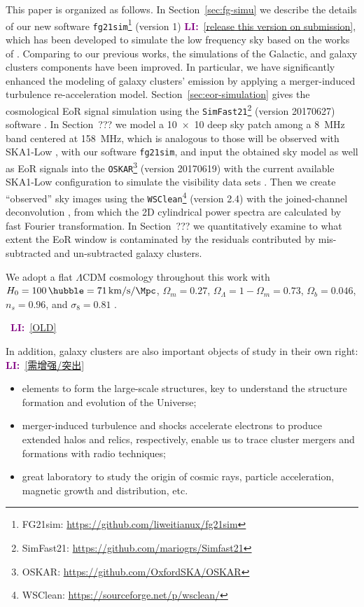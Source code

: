 \documentclass[modern]{aastex61}
\newcommand{\lcdm}{$\Lambda$CDM}
\newcommand{\LI}[1]{\textcolor{purple}{\textbf{LI:}}~\uline{#1}}
\begin{document}
This paper is organized as follows.
In Section~\ref{sec:fg-simu} we describe the details of our new software
\texttt{fg21sim}\footnote{FG21sim: \url{https://github.com/liweitianux/fg21sim}}
(version 1) \LI{[release this version on submission]},
which has been developed to simulate the low frequency sky based on the
works of \citet{wang2010,wang2013}.
Comparing to our previous works, the simulations of the Galactic,
and galaxy clusters components have been improved.
In particular, we have significantly enhanced the modeling of galaxy clusters'
emission by applying a merger-induced turbulence re-acceleration model.
Section~\ref{sec:eor-simulation} gives the cosmological EoR signal simulation
using the \texttt{SimFast21}\footnote{SimFast21:
  \url{https://github.com/mariogrs/Simfast21}} (version 20170627)
software \citep{santos2010,hassan2016}.
In Section~??? we model a \SI[product-units=power]{10 x 10}{\deg} deep sky
patch among a \SI{8}{\MHz} band centered at \SI{158}{\MHz}, which is
analogous to those will be observed with SKA1-Low
\citep[see][for updated SKA observing strategies]{koopmans2015rev},
with our software \texttt{fg21sim},
and input the obtained sky model as well as EoR signals into the
\texttt{OSKAR}\footnote{OSKAR: \url{https://github.com/OxfordSKA/OSKAR}}
(version 20170619) with the current available SKA1-Low configuration to
simulate the visibility data sets \citep{mort2010}.
Then we create \enquote{observed} sky images using the
\texttt{WSClean}\footnote{WSClean: \url{https://sourceforge.net/p/wsclean/}}
(version 2.4) with the joined-channel deconvolution
\citep{offringa2014,offringa2017}, from which the 2D cylindrical power spectra
are calculated by fast Fourier transformation.
In Section~??? we quantitatively examine to what extent the EoR window is
contaminated by the residuals contributed by mis-subtracted and un-subtracted
galaxy clusters.

We adopt a flat \lcdm{} cosmology throughout this work with
$H_0 = \SI{100}{\hubble} = \SI{71}{\km\per\second\per\Mpc}$,
$\Omega_m = 0.27$, $\Omega_{\Lambda} = 1 - \Omega_m = 0.73$,
$\Omega_b = 0.046$, $n_s = 0.96$, and $\sigma_8 = 0.81$
\citep{komatsu2011}.

\noindent\hrulefill~\LI{[OLD]}~\hrulefill

In addition, galaxy clusters are also important objects of study in their
own right:
\LI{[需增强/突出]}
\begin{itemize}
  \item elements to form the large-scale structures, key to understand the
    structure formation and evolution of the Universe;
  \item merger-induced turbulence and shocks accelerate electrons to produce
    extended halos and relics, respectively, enable us to trace cluster
    mergers and formations with radio techniques;
  \item great laboratory to study the origin of cosmic rays, particle
    acceleration, magnetic growth and distribution, etc.
\end{itemize}
\end{document}
